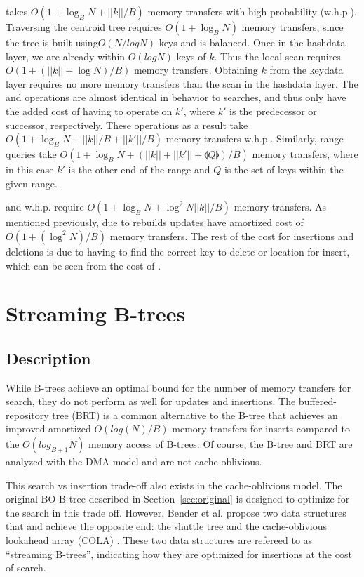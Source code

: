 \documentclass{style}
\begin{document}
\Search{} takes $O(1+\log_{B}N+||k||/B)$ memory transfers with high
probability (w.h.p.). Traversing the centroid tree requires $O(1+\log_{B}N)$
memory transfers, since the tree is built using$O(N/logN)$ keys and is
balanced. Once in the hashdata layer, we are already within $O(logN)$ keys of
$k$. Thus the local scan requires $O(1+(||k||+\log{}N)/B)$ memory transfers.
Obtaining $k$ from the keydata layer requires no more memory transfers than
the scan in the hashdata layer. The \Pred{} and \Succ{} operations are almost
identical in behavior to searches, and thus only have the added cost of having
to operate on $k'$, where $k'$ is the predecessor or successor, respectively.
These operations as a result take $O(1+\log_{B}N+||k||/B+||k'||/B)$ memory
transfers w.h.p.. Similarly, range queries take
$O(1+\log_{B}N+(||k||+||k'||+\llangle{}Q\rrangle{})/B)$ memory transfers,
where in this case $k'$ is the other end of the range and $Q$ is the set of
keys within the given range.

\Insertkonly{} and \Delete{} w.h.p. require $O(1+\log_{B}N+\log^{2}N||k||/B)$
memory transfers. As mentioned previously, due to rebuilds updates have
amortized cost of $O(1+(\log^{2}N)/B)$ memory transfers. The rest of the cost
for insertions and deletions is due to having to find the correct key to
delete or location for insert, which can be seen from the cost of \Search{}.

\section{Streaming B-trees}

\subsection{Description}

While B-trees achieve an optimal bound for the number of memory transfers for
search, they do not perform as well for updates and insertions. The
buffered-repository tree (BRT) is a common alternative to the B-tree that
achieves an improved amortized $O(log(N)/B)$ memory transfers for inserts
compared to the $O(log_{B+1}N)$ memory access of B-trees. Of course, the
B-tree and BRT are analyzed with the DMA model and are not cache-oblivious.

This search vs insertion trade-off also exists in the cache-oblivious model.
The original BO B-tree described in Section~\ref{sec:original} is designed to
optimize for the search in this trade off. However, Bender et al. propose two
data structures that and achieve the opposite end: the shuttle tree and the
cache-oblivious lookahead array (COLA) \cite{BenderFaFi07}. These two data
structures are refereed to as ``streaming B-trees'', indicating how they are
optimized for insertions at the cost of search.
\end{document}

